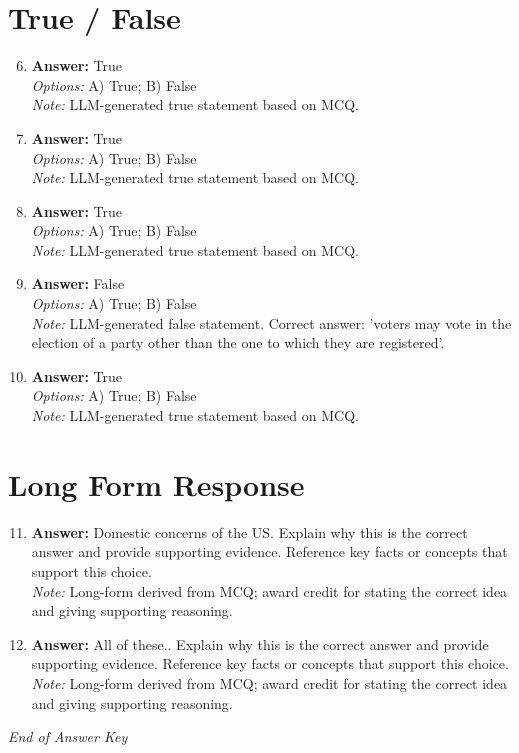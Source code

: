 \documentclass[12pt]{article}
\begin{document}
\section*{True / False}
\begin{enumerate}[label=\arabic*.]
\setcounter{enumi}{5}
\item \textbf{Answer:} True
\\ \textit{Options:} A) True; B) False
\\ \textit{Note:} LLM-generated true statement based on MCQ.
\item \textbf{Answer:} True
\\ \textit{Options:} A) True; B) False
\\ \textit{Note:} LLM-generated true statement based on MCQ.
\item \textbf{Answer:} True
\\ \textit{Options:} A) True; B) False
\\ \textit{Note:} LLM-generated true statement based on MCQ.
\item \textbf{Answer:} False
\\ \textit{Options:} A) True; B) False
\\ \textit{Note:} LLM-generated false statement. Correct answer: 'voters may vote in the election of a party other than the one to which they are registered'.
\item \textbf{Answer:} True
\\ \textit{Options:} A) True; B) False
\\ \textit{Note:} LLM-generated true statement based on MCQ.
\end{enumerate}

\section*{Long Form Response}
\begin{enumerate}[label=\arabic*.]
\setcounter{enumi}{10}
\item \textbf{Answer:} Domestic concerns of the US. Explain why this is the correct answer and provide supporting evidence. Reference key facts or concepts that support this choice.
\\ \textit{Note:} Long-form derived from MCQ; award credit for stating the correct idea and giving supporting reasoning.
\item \textbf{Answer:} All of these.. Explain why this is the correct answer and provide supporting evidence. Reference key facts or concepts that support this choice.
\\ \textit{Note:} Long-form derived from MCQ; award credit for stating the correct idea and giving supporting reasoning.
\end{enumerate}

\vfill
\noindent\textit{End of Answer Key}
\end{document}
